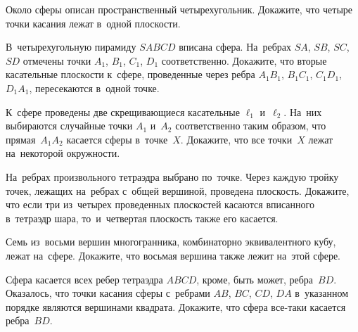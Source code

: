 \begin{problems}

\item
Около сферы описан пространственный четырехугольник.
Докажите, что четыре точки касания лежат в~одной плоскости.

\item
В~четырехугольную пирамиду $SABCD$ вписана сфера.
На~ребрах $SA$, $SB$, $SC$, $SD$ отмечены точки $A_1$, $B_1$, $C_1$, $D_1$
соответственно.
Докажите, что вторые касательные плоскости к~сфере, проведенные через ребра
$A_{1}B_{1}$, $B_{1}C_{1}$, $C_{1}D_{1}$, $D_{1}A_{1}$, пересекаются в~одной
точке.

\item
К~сфере проведены две скрещивающиеся касательные $\ell_1$ и~$\ell_2$.
На~них выбираются случайные точки $A_1$ и~$A_2$ соответственно таким образом,
что прямая~$A_{1}A_{2}$ касается сферы в~точке~$X$.
Докажите, что все точки~$X$ лежат на~некоторой окружности.

\item
На~ребрах произвольного тетраэдра выбрано по~точке.
Через каждую тройку точек, лежащих на~ребрах с~общей вершиной, проведена
плоскость.
Докажите, что если три из~четырех проведенных плоскостей касаются вписанного
в~тетраэдр шара, то~и~четвертая плоскость также его касается.

\item
Семь из~восьми вершин многогранника, комбинаторно эквивалентного кубу, лежат
на~сфере.
Докажите, что восьмая вершина также лежит на~этой сфере.

\item
Сфера касается всех ребер тетраэдра $ABCD$, кроме, быть может, ребра~$BD$.
Оказалось, что точки касания сферы с~ребрами $AB$, $BC$, $CD$, $DA$ в~указанном
порядке являются вершинами квадрата.
Докажите, что сфера все-таки касается ребра~$BD$.

\end{problems}

\endgroup %

